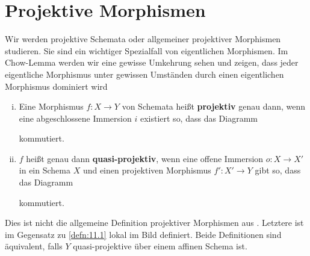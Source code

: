 
\chapter{Projektive Morphismen}

Wir werden projektive Schemata oder allgemeiner projektiver Morphismen studieren. Sie sind ein wichtiger Spezialfall von eigentlichen Morphismen. Im Chow-Lemma werden wir eine gewisse Umkehrung sehen und zeigen, dass jeder
eigentliche Morphismus unter gewissen Umständen durch einen eigentlichen Morphismus dominiert wird %

\begin{defn}
  \label{defn:11.1}
  \begin{enumerate}[i)]
  \item Eine Morphismus $f \colon X \to Y$ von Schemata heißt \textbf{projektiv} genau dann, wenn eine abgeschlossene Immersion $i$ existiert so, dass das Diagramm
    \begin{center}
    \end{center}
    kommutiert.
  \item $f$ heißt genau dann \textbf{quasi-projektiv}, wenn eine offene Immersion $o \colon X \to X'$ in ein Schema $X$ und einen projektiven Morphismus $f' \colon X' \to Y$ gibt so, dass das Diagramm
    \begin{center}
    \end{center}
    kommutiert.
  \end{enumerate}
\end{defn}

\begin{warn}
  \label{warn:11.2}
  Dies ist nicht die allgemeine Definition projektiver Morphismen aus \cite[5.5]{grothendieck1971elements}. Letztere ist im Gegensatz zu \ref{defn:11.1} lokal im Bild definiert.
  Beide Definitionen sind äquivalent, falls $Y$ quasi-projektive über einem affinen Schema ist.
\end{warn}

